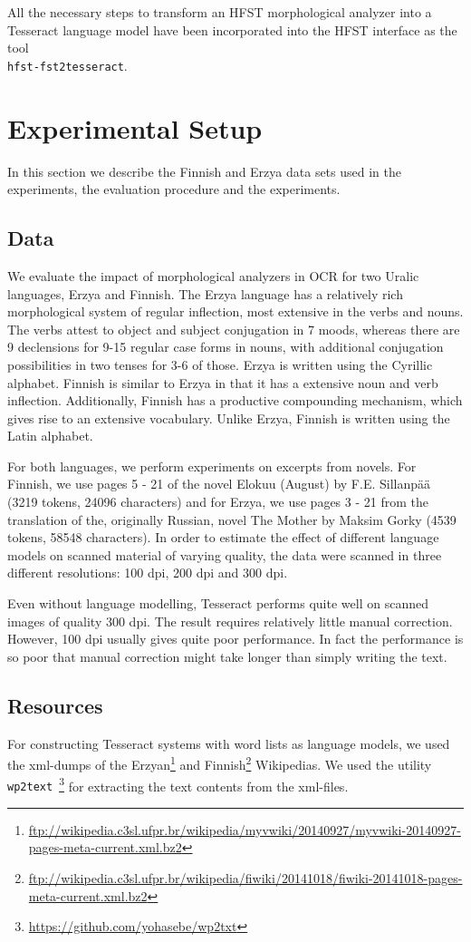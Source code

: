 \documentclass[b5paper]{article}
\begin{document}
All the necessary steps to transform an HFST morphological analyzer
into a Tesseract language model have been incorporated into the HFST
interface as the tool\\{\tt hfst-fst2tesseract}.

\section{Experimental Setup}
\label{exp}

In this section we describe the Finnish and Erzya data sets used in
the experiments, the evaluation procedure and the experiments.

\subsection{Data}
We evaluate the impact of morphological analyzers in OCR for two
Uralic languages, Erzya and Finnish. 
The Erzya language has a relatively rich morphological system of
regular inflection, most extensive in the verbs and nouns. The verbs
attest to object and subject conjugation in 7 moods, whereas there are
9 declensions for 9-15 regular case forms in nouns, with additional
conjugation possibilities in two tenses for 3-6 of those. Erzya is
written using the Cyrillic alphabet.
Finnish is similar to Erzya in that it has a extensive noun and verb
inflection. Additionally, Finnish has a productive compounding
mechanism, which gives rise to an extensive vocabulary. Unlike Erzya,
Finnish is written using the Latin alphabet.

For both languages, we perform experiments on excerpts from novels.
For Finnish, we use pages 5 - 21 of the novel Elokuu (August) by
F.E. Sillanp\"{a}\"{a} \cite{sillanpaa08} (3219 tokens, 24096
characters) and for Erzya, we use pages 3 - 21 from the translation of
the, originally Russian, novel The Mother by Maksim Gorky \cite{gorki}
(4539 tokens, 58548 characters). In order to estimate the effect of
different language models on scanned material of varying quality, the
data were scanned in three different resolutions: 100 dpi, 200 dpi and
300 dpi.

Even without language modelling, Tesseract performs quite well on
scanned images of quality 300 dpi. The result requires relatively
little manual correction. However, 100 dpi usually gives quite poor
performance. In fact the performance is so poor that manual correction
might take longer than simply writing the text.

\subsection{Resources}
For constructing Tesseract systems with word lists as language models,
we used the xml-dumps of the
Erzyan\footnote{\url{ftp://wikipedia.c3sl.ufpr.br/wikipedia/myvwiki/20140927/myvwiki-20140927-pages-meta-current.xml.bz2}}
and
Finnish\footnote{\url{ftp://wikipedia.c3sl.ufpr.br/wikipedia/fiwiki/20141018/fiwiki-20141018-pages-meta-current.xml.bz2}}
Wikipedias. We used the utility {\tt
  wp2text}~\footnote{\url{https://github.com/yohasebe/wp2txt}} for
extracting the text contents from the xml-files.
\end{document}
